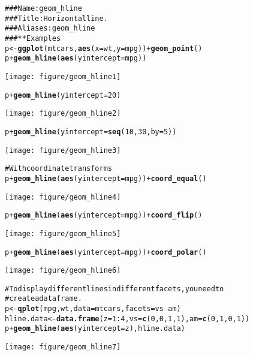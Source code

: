 \documentclass[a4paper,titlepage]{tufte-handout}\usepackage{graphicx, color}
\makeatletter
\def\maxwidth{ %
  \ifdim\Gin@nat@width>\linewidth
    \linewidth
  \else
    \Gin@nat@width
  \fi
}
\newcommand{\hlfunctioncall}[1]{\textcolor[rgb]{0.501960784313725,0,0.329411764705882}{\textbf{#1}}}%
\newcommand{\hlcomment}[1]{\textcolor[rgb]{0.180392156862745,0.6,0.341176470588235}{#1}}%
\newenvironment{kframe}{%
 \def\at@end@of@kframe{}%
 \ifinner\ifhmode%
  \def\at@end@of@kframe{\end{minipage}}%
  \begin{minipage}{\columnwidth}%
 \fi\fi%
 \def\FrameCommand##1{\hskip\@totalleftmargin \hskip-\fboxsep
 \colorbox{shadecolor}{##1}\hskip-\fboxsep
     \hskip-\linewidth \hskip-\@totalleftmargin \hskip\columnwidth}%
 \MakeFramed {\advance\hsize-\width
   \@totalleftmargin\z@ \linewidth\hsize
   \@setminipage}}%
 {\par\unskip\endMakeFramed%
 \at@end@of@kframe}
\newenvironment{knitrout}{}{} %
\makeatother
\begin{document}
\begin{knitrout}
\color{fgcolor}\begin{kframe}
\begin{alltt}
\hlcomment{### Name: geom_hline}
\hlcomment{### Title: Horizontal line.}
\hlcomment{### Aliases: geom_hline}
\hlcomment{### ** Examples}
p <- \hlfunctioncall{ggplot}(mtcars, \hlfunctioncall{aes}(x = wt, y=mpg)) + \hlfunctioncall{geom_point}()
p + \hlfunctioncall{geom_hline}(\hlfunctioncall{aes}(yintercept=mpg))
\end{alltt}
\end{kframe}\texttt{[image: figure/geom\_hline1]} \begin{kframe}\begin{alltt}
p + \hlfunctioncall{geom_hline}(yintercept=20)
\end{alltt}
\end{kframe}\texttt{[image: figure/geom\_hline2]} \begin{kframe}\begin{alltt}
p + \hlfunctioncall{geom_hline}(yintercept=\hlfunctioncall{seq}(10, 30, by=5))
\end{alltt}
\end{kframe}\texttt{[image: figure/geom\_hline3]} \begin{kframe}\begin{alltt}
\hlcomment{# With coordinate transforms}
p + \hlfunctioncall{geom_hline}(\hlfunctioncall{aes}(yintercept=mpg)) + \hlfunctioncall{coord_equal}()
\end{alltt}
\end{kframe}\texttt{[image: figure/geom\_hline4]} \begin{kframe}\begin{alltt}
p + \hlfunctioncall{geom_hline}(\hlfunctioncall{aes}(yintercept=mpg)) + \hlfunctioncall{coord_flip}()
\end{alltt}
\end{kframe}\texttt{[image: figure/geom\_hline5]} \begin{kframe}\begin{alltt}
p + \hlfunctioncall{geom_hline}(\hlfunctioncall{aes}(yintercept=mpg)) + \hlfunctioncall{coord_polar}()
\end{alltt}
\end{kframe}\texttt{[image: figure/geom\_hline6]} \begin{kframe}\begin{alltt}
\hlcomment{# To display different lines in different facets, you need to}
\hlcomment{# create a data frame.}
p <- \hlfunctioncall{qplot}(mpg, wt, data=mtcars, facets = vs ~ am)
hline.data <- \hlfunctioncall{data.frame}(z = 1:4, vs = \hlfunctioncall{c}(0,0,1,1), am = \hlfunctioncall{c}(0,1,0,1))
p + \hlfunctioncall{geom_hline}(\hlfunctioncall{aes}(yintercept = z), hline.data)
\end{alltt}
\end{kframe}\texttt{[image: figure/geom\_hline7]} 
\end{knitrout}
\end{document}

